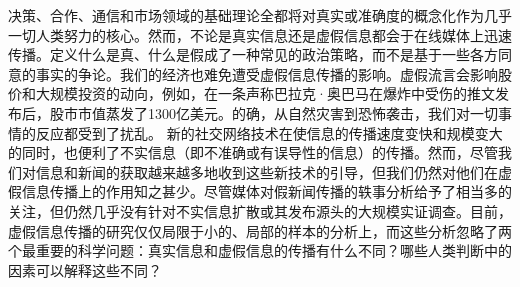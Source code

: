 \documentclass[a4paper,oneside,12pt]{book}
\begin{document}
\thispagestyle{empty}

\begin{center}
\sihao{}

\xiaosihao{}

\xiaosihao{}
\end{center}

\songti{}
决策、合作、通信和市场领域的基础理论全都将对真实或准确度的概念化作为几乎一切人类努力的核心。然而，不论是真实信息还是虚假信息都会于在线媒体上迅速传播。定义什么是真、什么是假成了一种常见的政治策略，而不是基于一些各方同意的事实的争论。我们的经济也难免遭受虚假信息传播的影响。虚假流言会影响股价和大规模投资的动向，例如，在一条声称巴拉克·奥巴马在爆炸中受伤的推文发布后，股市市值蒸发了1300亿美元。的确，从自然灾害到恐怖袭击，我们对一切事情的反应都受到了扰乱。
新的社交网络技术在使信息的传播速度变快和规模变大的同时，也便利了不实信息（即不准确或有误导性的信息）的传播。然而，尽管我们对信息和新闻的获取越来越多地收到这些新技术的引导，但我们仍然对他们在虚假信息传播上的作用知之甚少。尽管媒体对假新闻传播的轶事分析给予了相当多的关注，但仍然几乎没有针对不实信息扩散或其发布源头的大规模实证调查。目前，虚假信息传播的研究仅仅局限于小的、局部的样本的分析上，而这些分析忽略了两个最重要的科学问题：真实信息和虚假信息的传播有什么不同？哪些人类判断中的因素可以解释这些不同？

\thispagestyle{empty}
\begin{center}


\end{center}

 


 
\end{document}
